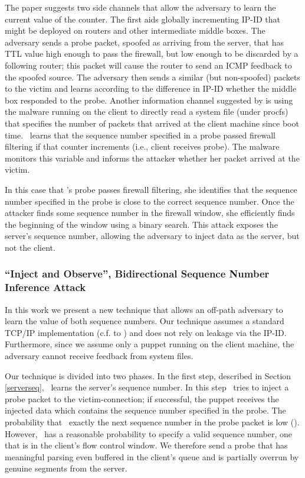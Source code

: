 \documentclass[conference]{IEEEtran}
\begin{document}
The paper suggests two side channels that allow the adversary to learn the current value of the counter. The first aids globally incrementing IP-ID that might be deployed on routers and other intermediate middle boxes. The adversary sends a probe packet, spoofed as arriving from the server, that has TTL value high enough to pass the firewall, but low enough to be discarded by a following router; this packet will cause the router to send an ICMP feedback to the spoofed source. The adversary then sends a similar (but non-spoofed) packets to the victim and learns according to the difference in IP-ID whether the middle box responded to the probe.
Another information channel suggested by \cite{snptcp} is using the malware running on the client to directly read a system file (under procfs) that specifies the number of packets that arrived at the client machine since boot time. \mal\ learns that the sequence number specified in a probe passed firewall filtering if that counter increments (i.e., client receives probe). The malware monitors this variable and informs the attacker whether her packet arrived at the victim.

In this case that \mal's probe passes firewall filtering, she identifies that the sequence number specified in the probe is close to the correct sequence number. Once the attacker finds some sequence number in the firewall window, she efficiently finds the beginning of the window using a binary search. This attack exposes the server's sequence number, allowing the adversary to inject data as the server, but not the client.

\subsubsection{``Inject and Observe'', Bidirectional Sequence Number Inference Attack} \label{injectandobservehigh}

In this work we present a new technique that allows an off-path adversary to learn the value of both sequence numbers. Our technique assumes a standard TCP/IP implementation (c.f. to \cite{woottcp}) and does not rely on leakage via the IP-ID. Furthermore, since we assume only a puppet running on the client machine, the adversary cannot receive feedback from system files. 

Our technique is divided into two phases. In the first step, described in Section \ref{serverseq}, \mal\ learns the server's sequence number. 
In this step \mal\ tries to inject a probe packet to the victim-connection; if successful, the puppet receives the injected data which contains the sequence number specified in the probe. The probability that \mal\ exactly the next sequence number in the probe packet is low (). However, \mal\ has a reasonable probability to specify a valid sequence number, one that is in the client's flow control window. We therefore send a probe that has meaningful parsing even buffered in the client's queue and is partially overrun by genuine segments from the server.
\end{document}
